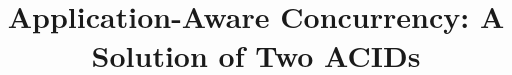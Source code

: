 \documentclass{sig-alternate}
\begin{document}
%

\title{Application-Aware Concurrency: A Solution of Two ACIDs
}
%
%
%
%
%
\end{document}
